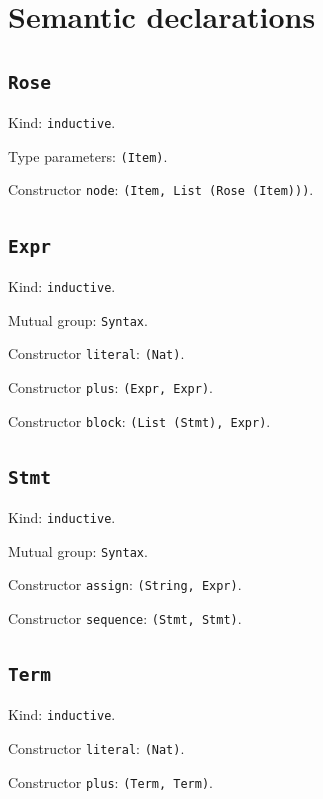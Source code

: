 \documentclass[11pt]{article}
\begin{document}
\section*{Semantic declarations}
\subsection*{\texttt{Rose}}
\noindent Kind: \texttt{inductive}.\par
\noindent Type parameters: \texttt{(Item)}.\par
\noindent Constructor \texttt{node}: \texttt{(Item, List (Rose (Item)))}.\par
\subsection*{\texttt{Expr}}
\noindent Kind: \texttt{inductive}.\par
\noindent Mutual group: \texttt{Syntax}.\par
\noindent Constructor \texttt{literal}: \texttt{(Nat)}.\par
\noindent Constructor \texttt{plus}: \texttt{(Expr, Expr)}.\par
\noindent Constructor \texttt{block}: \texttt{(List (Stmt), Expr)}.\par
\subsection*{\texttt{Stmt}}
\noindent Kind: \texttt{inductive}.\par
\noindent Mutual group: \texttt{Syntax}.\par
\noindent Constructor \texttt{assign}: \texttt{(String, Expr)}.\par
\noindent Constructor \texttt{sequence}: \texttt{(Stmt, Stmt)}.\par
\subsection*{\texttt{Term}}
\noindent Kind: \texttt{inductive}.\par
\noindent Constructor \texttt{literal}: \texttt{(Nat)}.\par
\noindent Constructor \texttt{plus}: \texttt{(Term, Term)}.\par
\end{document}
